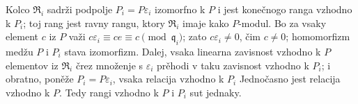 \documentclass[11pt]{article}
\begin{document}
Kolco $\mathfrak R_i$ sadrži podpolje $P_i=P\varepsilon_i$ izomorfno k $P$ i jest konečnogo ranga vzhodno k $P_i$; toj rang jest ravny rangu, ktory $\mathfrak R_i$ imaje kako $P$-modul. Bo za vsaky element $c$ iz $P$ važi $c\varepsilon_i\equiv ce\equiv c\pmod{\mathfrak q_i}$; zato $c\varepsilon_i\ne 0$, čim $c\ne0$; homomorfizm medžu $P$ i $P_i$ stava izomorfizm. Dalej, vsaka linearna zavisnost vzhodno k $P$ elementov iz $\mathfrak R_i$ črez množenje s $\varepsilon_i$ prěhodi v taku zavisnost vzhodno k $P_i$; i obratno, poněže $P_i=P\varepsilon_i$, vsaka relacija vzhodno k $P_i$ Jednočasno jest relacija vzhodno k $P$. Tedy rangi vzhodno k $P$ i $P_i$ sut jednaky.
\end{document}
